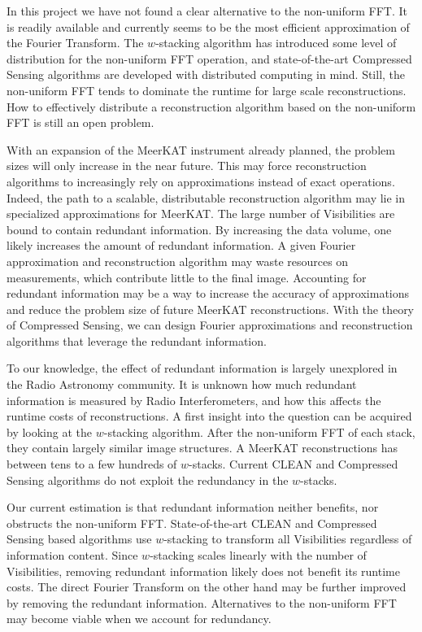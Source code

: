 In this project we have not found a clear alternative to the non-uniform FFT. It is readily available and currently seems to be the most efficient approximation of the Fourier Transform. The $w$-stacking algorithm\cite{offringa2014wsclean} has introduced some level of distribution for the non-uniform FFT operation, and state-of-the-art Compressed Sensing algorithms\cite{dabbech2018cygnus, pratley2018fast} are developed with distributed computing in mind. Still, the non-uniform FFT tends to dominate the runtime for large scale reconstructions. How to effectively distribute a reconstruction algorithm based on the non-uniform FFT is still an open problem.

With an expansion of the MeerKAT instrument already planned, the problem sizes will only increase in the near future. This may force reconstruction algorithms to increasingly rely on approximations instead of exact operations. Indeed, the path to a scalable, distributable reconstruction algorithm may lie in specialized approximations for MeerKAT. The large number of Visibilities are bound to contain redundant information. By increasing the data volume, one likely increases the amount of redundant information. A given Fourier approximation and reconstruction algorithm may waste resources on measurements, which contribute little to the final image. Accounting for redundant information may be a way to increase the accuracy of approximations and reduce the problem size of future MeerKAT reconstructions. With the theory of Compressed Sensing, we can design Fourier approximations and reconstruction algorithms that leverage the redundant information.

To our knowledge, the effect of redundant information is largely unexplored in the Radio Astronomy community. It is unknown how much redundant information is measured by Radio Interferometers, and how this affects the runtime costs of reconstructions. A first insight into the question can be acquired by looking at the $w$-stacking algorithm. After the non-uniform FFT of each stack, they contain largely similar image structures. A MeerKAT reconstructions has between tens to a few hundreds of $w$-stacks. Current CLEAN and Compressed Sensing algorithms do not exploit the redundancy in the $w$-stacks. 

Our current estimation is that redundant information neither benefits, nor obstructs the non-uniform FFT. State-of-the-art CLEAN and Compressed Sensing based algorithms use $w$-stacking to transform all Visibilities regardless of information content. Since $w$-stacking scales linearly with the number of Visibilities, removing redundant information likely does not benefit its runtime costs. The direct Fourier Transform on the other hand may be further improved by removing the redundant information. Alternatives to the non-uniform FFT may become viable when we account for redundancy.

